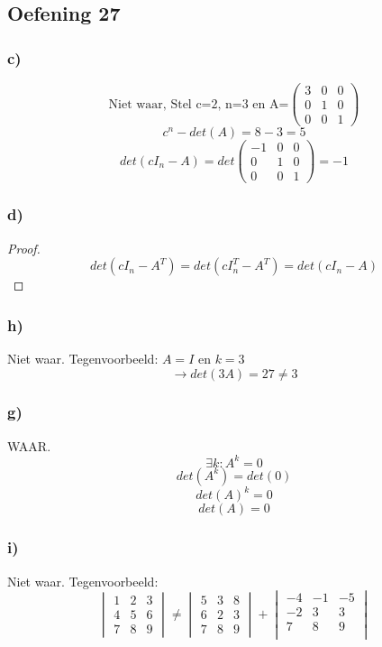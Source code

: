 \documentclass[lineaire_algebra_oplossingen.tex]{subfiles}
\begin{document}
\subsection{Oefening 27}
\subsubsection*{c)}
\[ \text{Niet waar, Stel c=2, n=3 en A=}
\begin{pmatrix}
3 & 0 & 0\\
0 & 1 & 0\\
0 & 0 & 1
\end{pmatrix} 
\]
\[c^{n}-det(A) = 8 - 3 = 5\]
\[ det (cI_{n}-A) = det
\begin{pmatrix}
-1 & 0 & 0 \\
0 & 1 & 0\\
0 & 0 & 1
\end{pmatrix}
= -1\]

\subsubsection*{d)}
\begin{proof}
\[
det(cI_n - A^T) = det(cI_n^T - A^T) = det(cI_n - A)
\]
\end{proof}

\subsubsection*{h)}
Niet waar. Tegenvoorbeeld: $A=I$ en $k=3$
\[
\rightarrow det(3A) = 27 \neq 3
\]
\subsubsection*{g)}
WAAR.
\[
\exists k: A^k = 0
\]
\[
det(A^k) = det(0)
\]
\[
det(A)^k = 0
\]
\[
det(A) = 0
\]

\subsubsection*{i)}
Niet waar. Tegenvoorbeeld: 
\[
    \begin{vmatrix}
        1 & 2 & 3\\
        4 & 5 & 6\\
        7 & 8 & 9
    \end{vmatrix} \neq
    \begin{vmatrix}
        5 & 3 & 8\\
        6 & 2 & 3\\
        7 & 8 & 9
    \end{vmatrix} + 
    \begin{vmatrix}
        -4 & -1 & -5\\
        -2 & 3 & 3\\
        7 & 8 & 9\\
    \end{vmatrix}
\]
\end{document}
